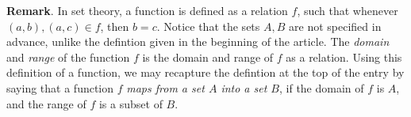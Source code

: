 \documentclass[12pt]{article}
\begin{document}
\textbf{Remark}.  In set theory, a function is defined as a relation $f$, such that whenever $(a,b),(a,c)\in f$, then $b=c$.  Notice that the sets $A,B$ are not specified in advance, unlike the defintion given in the beginning of the article.  The \emph{domain} and \emph{range} of the function $f$ is the domain and range of $f$ as a relation.  Using this definition of a function, we may recapture the defintion at the top of the entry by saying that a function $f$ \emph{maps from a set $A$ into a set $B$}, if the domain of $f$ is $A$, and the range of $f$ is a subset of $B$.
\end{document}
